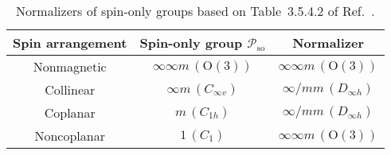 \documentclass[a4paper, 11pt]{article}
\theoremstyle{definition}
\begin{document}
\begin{table}[tb]
  \centering
  \caption{
    Normalizers of spin-only groups based on Table~3.5.4.2 of Ref.~\cite{koch2016normalizers}.
  }
  \label{tab:spin_only_normalizers}
  \begin{tabular}{ccc}
    \hline \hline
    Spin arrangement & Spin-only group $\mathcal{P}_{\mathrm{so}}$ & Normalizer \\
    \hline
    Nonmagnetic & $\infty \infty m \,(\mathrm{O}(3))$ & $\infty \infty m \,(\mathrm{O}(3))$ \\
    Collinear & $\infty m \,(C_{\infty v})$ & $\infty / mm \, (D_{\infty h})$ \\
    Coplanar & $m \,(C_{1h})$ & $\infty / mm \, (D_{\infty h})$ \\
    Noncoplanar & $1 \, (C_{1})$ & $\infty \infty m \,(\mathrm{O}(3))$ \\
    \hline \hline
  \end{tabular}
\end{table}
\end{document}
